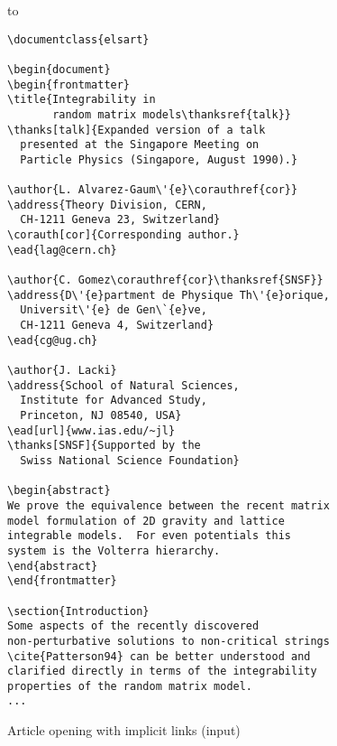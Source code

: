\documentclass{elsart}
\begin{document}
\begin{figure}[p]
\begin{minipage}{\textwidth}
\leavevmode\hbox to 

\end{minipage}

\bigskip

\end{figure}


\begin{figure}[p]
\caption{Article opening with implicit links (input)\label{ex:implinput}}
\vspace{1pc}

\begin{verbatim}
\documentclass{elsart}

\begin{document}
\begin{frontmatter}
\title{Integrability in
       random matrix models\thanksref{talk}}
\thanks[talk]{Expanded version of a talk
  presented at the Singapore Meeting on
  Particle Physics (Singapore, August 1990).}

\author{L. Alvarez-Gaum\'{e}\corauthref{cor}}
\address{Theory Division, CERN,
  CH-1211 Geneva 23, Switzerland}
\corauth[cor]{Corresponding author.}
\ead{lag@cern.ch}

\author{C. Gomez\corauthref{cor}\thanksref{SNSF}}
\address{D\'{e}partment de Physique Th\'{e}orique, 
  Universit\'{e} de Gen\`{e}ve,
  CH-1211 Geneva 4, Switzerland}
\ead{cg@ug.ch}

\author{J. Lacki}
\address{School of Natural Sciences,
  Institute for Advanced Study,
  Princeton, NJ 08540, USA}
\ead[url]{www.ias.edu/~jl}
\thanks[SNSF]{Supported by the
  Swiss National Science Foundation}

\begin{abstract}
We prove the equivalence between the recent matrix
model formulation of 2D gravity and lattice
integrable models.  For even potentials this
system is the Volterra hierarchy.
\end{abstract}
\end{frontmatter}

\section{Introduction}
Some aspects of the recently discovered
non-perturbative solutions to non-critical strings
\cite{Patterson94} can be better understood and
clarified directly in terms of the integrability
properties of the random matrix model.
...
\end{verbatim}

\end{figure}
\end{document}
